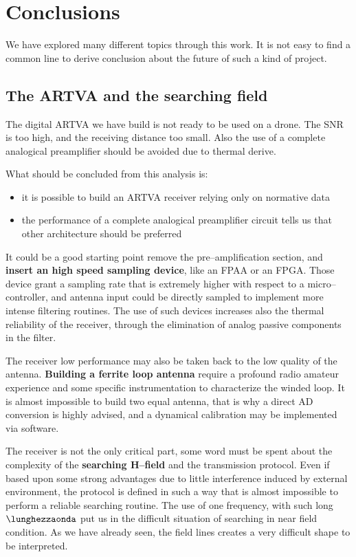 \chapter{Conclusions}
\minitoc

We have explored many different topics through this work. It is not easy to find a common line to derive conclusion about the future of such a kind of project. 

\section{The ARTVA and the searching field}

The digital ARTVA we have build is not ready to be used on a drone. The SNR is too high, and the receiving distance too small. Also the use of a complete analogical preamplifier should be avoided due to thermal derive.

What should be concluded from this analysis is:
\begin{itemize}
\item it is possible to build an ARTVA receiver relying only on normative data
\item the performance of a complete analogical preamplifier circuit tells us that other architecture should be preferred
\end{itemize}

It could be a good starting point remove the pre--amplification section, and \textbf{insert an high speed sampling device}, like an FPAA or an FPGA. Those device grant a sampling rate that is extremely higher with respect to a micro--controller, and antenna input could be directly sampled to implement more intense filtering routines. The use of such devices increases also the thermal reliability of the receiver, through the elimination of analog passive components in the filter. 

The receiver low performance may also be taken back to the low quality of the antenna. \textbf{Building a ferrite loop antenna} require a profound radio amateur experience and some specific instrumentation to characterize the winded loop. It is almost impossible to build two equal antenna, that is why a direct AD conversion is highly advised, and a dynamical calibration may be implemented via software.

The receiver is not the only critical part, some word must be spent about the complexity of the \textbf{searching H--field} and the transmission protocol. Even if based upon some strong advantages due to little interference induced by external environment, the protocol is defined in such a way that is almost impossible to perform a reliable searching routine. The use of one frequency, with such long $\lunghezzaonda$ put us in the difficult situation of searching in near field condition. As we have already seen, the field lines creates a very difficult shape to be interpreted.

